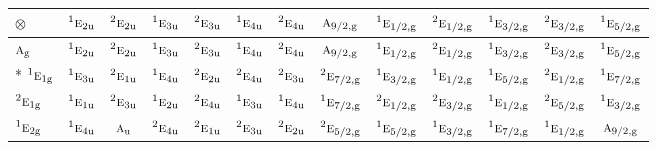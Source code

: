 \documentclass[10pt,a4paper]{article}
\numberwithin{equation}{section}
\newcommand{\irr}[1]{\text{\normalfont\scshape #1}}
\newcommand{\conjpair}[1]{{}^{#1}}
\newcommand{\ptag}[1]{\mathrm{#1}}
\newcommand{\irrprod}{\otimes}
\begin{document}
{\small\setlength{\tabcolsep}{3pt}\begin{longtable}{@{}lcccccccccccc@{}}\toprule
$\irrprod$ & $\conjpair{1}\irr{e}_{2\ptag{u}}$ & $\conjpair{2}\irr{e}_{2\ptag{u}}$ & $\conjpair{1}\irr{e}_{3\ptag{u}}$ & $\conjpair{2}\irr{e}_{3\ptag{u}}$ & $\conjpair{1}\irr{e}_{4\ptag{u}}$ & $\conjpair{2}\irr{e}_{4\ptag{u}}$ & $\irr{a}_{9/2,\ptag{g}}$ & $\conjpair{1}\irr{e}_{1/2,\ptag{g}}$ & $\conjpair{2}\irr{e}_{1/2,\ptag{g}}$ & $\conjpair{1}\irr{e}_{3/2,\ptag{g}}$ & $\conjpair{2}\irr{e}_{3/2,\ptag{g}}$ & $\conjpair{1}\irr{e}_{5/2,\ptag{g}}$\\\midrule\endhead
\bottomrule\endfoot\endlastfoot
$\irr{a}_{\ptag{g}}$ & $\conjpair{1}\irr{e}_{2\ptag{u}}$ & $\conjpair{2}\irr{e}_{2\ptag{u}}$ & $\conjpair{1}\irr{e}_{3\ptag{u}}$ & $\conjpair{2}\irr{e}_{3\ptag{u}}$ & $\conjpair{1}\irr{e}_{4\ptag{u}}$ & $\conjpair{2}\irr{e}_{4\ptag{u}}$ & $\irr{a}_{9/2,\ptag{g}}$ & $\conjpair{1}\irr{e}_{1/2,\ptag{g}}$ & $\conjpair{2}\irr{e}_{1/2,\ptag{g}}$ & $\conjpair{1}\irr{e}_{3/2,\ptag{g}}$ & $\conjpair{2}\irr{e}_{3/2,\ptag{g}}$ & $\conjpair{1}\irr{e}_{5/2,\ptag{g}}$\\*
$\conjpair{1}\irr{e}_{1\ptag{g}}$ & $\conjpair{1}\irr{e}_{3\ptag{u}}$ & $\conjpair{2}\irr{e}_{1\ptag{u}}$ & $\conjpair{1}\irr{e}_{4\ptag{u}}$ & $\conjpair{2}\irr{e}_{2\ptag{u}}$ & $\conjpair{2}\irr{e}_{4\ptag{u}}$ & $\conjpair{2}\irr{e}_{3\ptag{u}}$ & $\conjpair{2}\irr{e}_{7/2,\ptag{g}}$ & $\conjpair{1}\irr{e}_{3/2,\ptag{g}}$ & $\conjpair{1}\irr{e}_{1/2,\ptag{g}}$ & $\conjpair{1}\irr{e}_{5/2,\ptag{g}}$ & $\conjpair{2}\irr{e}_{1/2,\ptag{g}}$ & $\conjpair{1}\irr{e}_{7/2,\ptag{g}}$\\
$\conjpair{2}\irr{e}_{1\ptag{g}}$ & $\conjpair{1}\irr{e}_{1\ptag{u}}$ & $\conjpair{2}\irr{e}_{3\ptag{u}}$ & $\conjpair{1}\irr{e}_{2\ptag{u}}$ & $\conjpair{2}\irr{e}_{4\ptag{u}}$ & $\conjpair{1}\irr{e}_{3\ptag{u}}$ & $\conjpair{1}\irr{e}_{4\ptag{u}}$ & $\conjpair{1}\irr{e}_{7/2,\ptag{g}}$ & $\conjpair{2}\irr{e}_{1/2,\ptag{g}}$ & $\conjpair{2}\irr{e}_{3/2,\ptag{g}}$ & $\conjpair{1}\irr{e}_{1/2,\ptag{g}}$ & $\conjpair{2}\irr{e}_{5/2,\ptag{g}}$ & $\conjpair{1}\irr{e}_{3/2,\ptag{g}}$\\
$\conjpair{1}\irr{e}_{2\ptag{g}}$ & $\conjpair{1}\irr{e}_{4\ptag{u}}$ & $\irr{a}_{\ptag{u}}$ & $\conjpair{2}\irr{e}_{4\ptag{u}}$ & $\conjpair{2}\irr{e}_{1\ptag{u}}$ & $\conjpair{2}\irr{e}_{3\ptag{u}}$ & $\conjpair{2}\irr{e}_{2\ptag{u}}$ & $\conjpair{2}\irr{e}_{5/2,\ptag{g}}$ & $\conjpair{1}\irr{e}_{5/2,\ptag{g}}$ & $\conjpair{1}\irr{e}_{3/2,\ptag{g}}$ & $\conjpair{1}\irr{e}_{7/2,\ptag{g}}$ & $\conjpair{1}\irr{e}_{1/2,\ptag{g}}$ & $\irr{a}_{9/2,\ptag{g}}$\\

\end{longtable}}
\end{document}
